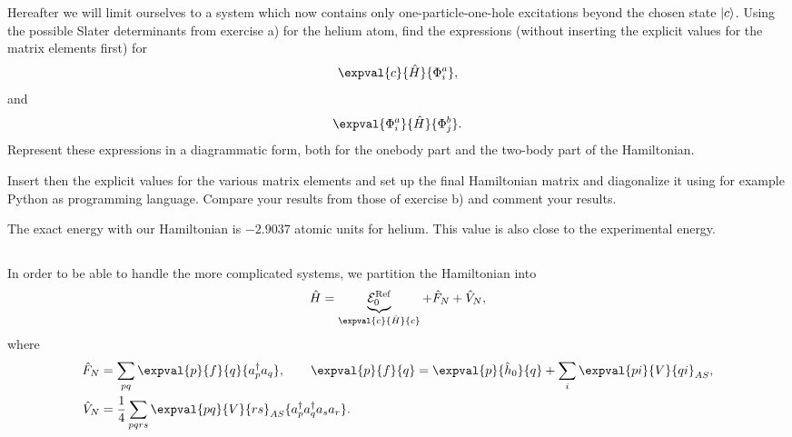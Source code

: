 Hereafter we will limit ourselves to a system which now contains only one-particle-one-hole excitations beyond the chosen state $\lvert c\rangle$.
Using the possible Slater determinants from exercise a) for the helium atom, find the expressions (without inserting the explicit values for the matrix elements first) for %
\begin{equation*}
    \expval{c}{\hat{H}}{\Phi_i^a},
\end{equation*}
and
\begin{equation*}
    \expval{\Phi_i^a}{\hat{H}}{\Phi_j^b}.
\end{equation*}
Represent these expressions in a diagrammatic form, both for the onebody part and the two-body part of the Hamiltonian.

Insert then the explicit values for the various matrix elements and set up the final Hamiltonian matrix and diagonalize it using for example Python as programming language.
Compare your results from those of exercise b) and comment your results. %

The exact energy with our Hamiltonian is $-2.9037$ atomic units for helium.
This value is also close to the experimental energy.

\subsection{}
In order to be able to handle the more complicated systems, we partition the Hamiltonian into
\begin{equation}
    \hat{H} = \underbrace{\mathcal{E}_0^{\text{Ref}}}_{\expval{c}{\hat{H}}{c}} + \hat{F}_N + \hat{V}_N,
\end{equation}
where
\begin{align*}
    \hat{F}_N &= \sum_{pq} \expval{p}{f}{q} \{a_p^\dagger a_q\}, \qquad
    \expval{p}{f}{q} = \expval{p}{\hat{h}_0}{q} + \sum_{i} \expval{pi}{V}{qi}_{AS}, \\
    \hat{V}_N &= \frac{1}{4} \sum_{pqrs} \expval{pq}{V}{rs}_{AS} \{a_p^\dagger a_q^\dagger a_s a_r\}.
\end{align*}

